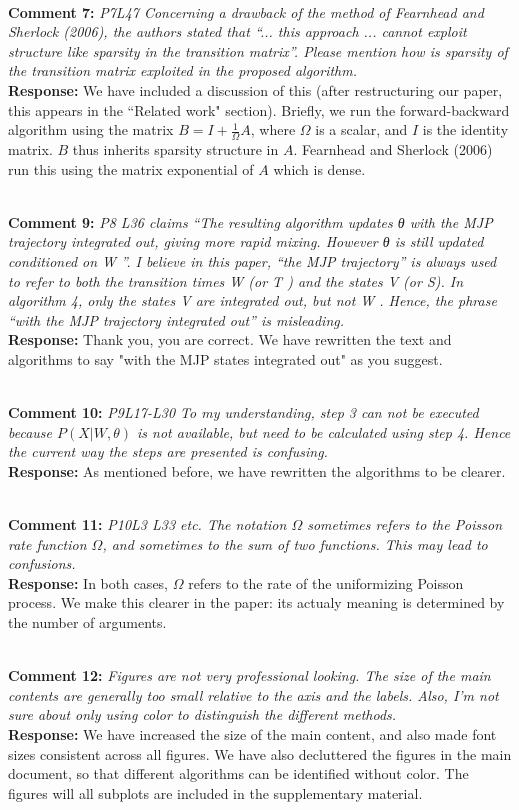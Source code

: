 \documentclass[11pt]{article}
\newcommand{\rev}[2]{\textbf{Comment #1: }\emph{#2}}
\newcommand{\resp}{\textbf{Response: }}
\begin{document}
~\\
\noindent \rev{7}{P7L47 Concerning a drawback of the method of Fearnhead and Sherlock (2006), the authors stated that “... this approach ... cannot exploit structure like sparsity in the transition matrix”. Please mention how is sparsity of the transition matrix exploited in the proposed algorithm.}
\\
\resp{We have included a discussion of this (after restructuring our paper, this appears in the ``Related work" section). Briefly, we run the forward-backward algorithm using the matrix $B = I + \frac{1}{\Omega}A$, where $\Omega$ is a scalar, and $I$ is the identity matrix. $B$ thus inherits sparsity structure in $A$. Fearnhead and Sherlock (2006) run this using the matrix exponential of $A$ which is dense.}

~\\
\rev{9}{P8 L36 claims “The resulting algorithm updates θ with the MJP trajectory integrated out, giving more rapid mixing. However θ is still updated conditioned on W ”. I believe in this paper, “the MJP trajectory” is always used to refer to both the transition times W (or T ) and the states V (or S). In algorithm 4, only the states V are integrated out, but not W . Hence, the phrase “with the MJP trajectory integrated out” is misleading.}\\
\resp{Thank you, you are correct. We have rewritten the text and algorithms to say "with the MJP states integrated out" as you suggest.}

~\\
\rev{10}{P9L17-L30 To my understanding, step 3 can not be executed because $P (X|W, \theta)$ is not available, but need to be calculated using step 4. Hence the current way the steps are presented is confusing.} \\
\resp{As mentioned before, we have rewritten the algorithms to be clearer.}

~\\
\rev{11}{P10L3 L33 etc. The notation $\Omega$ sometimes refers to the Poisson rate function $\Omega$, and sometimes to the sum of two functions. This may lead to confusions.}
~\\ 
\resp{In both cases, $\Omega$ refers to the rate of the uniformizing Poisson process. We make this clearer in the paper: its actualy meaning is determined by the number of arguments}. 

~\\ 
\rev{12}{Figures are not very professional looking. The size of the main contents are generally too small relative to the axis and the labels. Also, I’m not sure about only using color to distinguish the different methods.}\\
\resp{We have increased the size of the main content, and also made font sizes consistent across all figures. We have also decluttered the figures in the main document, so that different algorithms can be identified without color. The figures will all subplots are included in the supplementary material.} 
\end{document}
